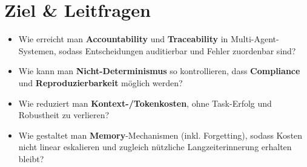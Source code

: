 \section{Ziel \& Leitfragen}
\begin{itemize}
  \item Wie erreicht man \textbf{Accountability} und \textbf{Traceability} in Multi-Agent-Systemen, sodass Entscheidungen auditierbar und Fehler zuordenbar sind?
  \item Wie kann man \textbf{Nicht-Determinismus} so kontrollieren, dass \textbf{Compliance} und \textbf{Reproduzierbarkeit} möglich werden?
  \item Wie reduziert man \textbf{Kontext-/Tokenkosten}, ohne Task-Erfolg und Robustheit zu verlieren?
  \item Wie gestaltet man \textbf{Memory}-Mechanismen (inkl. Forgetting), sodass Kosten nicht linear eskalieren und zugleich nützliche Langzeiterinnerung erhalten bleibt?
\end{itemize}
